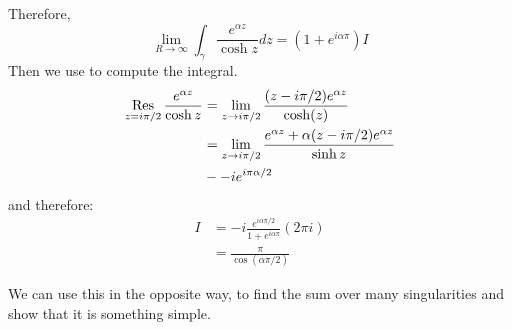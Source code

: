 \documentclass[../Main.tex]{subfiles}
\begin{document}
\begin{example}
    Therefore,
    \begin{equation*}
        \lim_{R \to \infty} \int_{\gamma} \frac{e^{\alpha z}}{\cosh z} dz = (1 + e^{i \alpha \pi}) I
    \end{equation*}
    Then we use  to compute the integral.
    \begin{align*}
        \operatorname*{Res}_{z = i \pi / 2} \frac{e^{\alpha z}}{\cosh z} &= \lim_{z \to i \pi / 2} \frac{(z - i \pi / 2) e^{\alpha z}}{\cosh(z)} \\
        &= \lim_{z \to i \pi / 2} \frac{e^{\alpha z} + \alpha (z - i \pi / 2) e^{\alpha z}}{\sinh z} \\
        &- -i e^{i \pi \alpha / 2}
    \end{align*}
    and therefore:
    \begin{align*}
        I &= -i \frac{e^{i \alpha \pi / 2}}{1 + e^{i \alpha \pi}}(2 \pi i) \\
        &= \frac{\pi}{\cos(\alpha \pi / 2)}
    \end{align*}
\end{example}
We can use this in the opposite way, to find the sum over many singularities and show that it is something simple.
\end{document}
